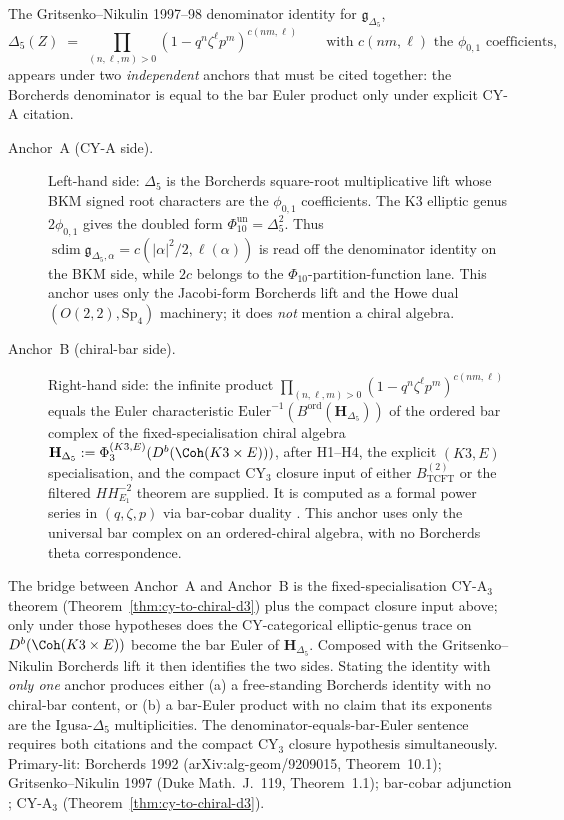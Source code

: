 \begin{remark}
\label{rem:k3e-cy3-two-anchor}
The Gritsenko--Nikulin 1997--98 denominator identity for $\mathfrak{g}_{\Delta_5}$,
\[
 \Delta_5(Z) \;=\; \prod_{(n, \ell, m) > 0} (1 - q^n \zeta^\ell p^m)^{c(nm, \ell)}
 \qquad \text{with } c(nm, \ell) \text{ the }\phi_{0,1}\text{ coefficients},
\]
appears under two \emph{independent} anchors that must be cited together: the Borcherds denominator is equal to the bar Euler product only under explicit CY-A citation.
\begin{description}
 \item[Anchor~A (CY-A side).] Left-hand side: $\Delta_5$ is the Borcherds square-root multiplicative lift whose BKM signed root characters are the \(\phi_{0,1}\) coefficients. The K3 elliptic genus \(2\phi_{0,1}\) gives the doubled form \(\Phi_{10}^{\mathrm{un}}=\Delta_5^2\). Thus \(\operatorname{sdim}\mathfrak g_{\Delta_5,\alpha}=c(|\alpha|^2/2,\ell(\alpha))\) is read off the denominator identity on the BKM side, while \(2c\) belongs to the \(\Phi_{10}\)-partition-function lane. This anchor uses only the Jacobi-form Borcherds lift and the Howe dual $(O(2,2), \mathrm{Sp}_4)$ machinery; it does \emph{not} mention a chiral algebra.
 \item[Anchor~B (chiral-bar side).] Right-hand side: the infinite product $\prod_{(n,\ell,m) > 0}(1 - q^n \zeta^\ell p^m)^{c(nm,\ell)}$ equals the Euler characteristic $\mathrm{Euler}^{-1}(B^{\mathrm{ord}}(\mathbf{H}_{\Delta_5}))$ of the ordered bar complex of the fixed-specialisation chiral algebra $\mathbf{H}_{\Delta_5} := \Phi_3^{(K3,E)}(D^b(\Coh(K3 \times E)))$, after H1--H4, the explicit $(K3,E)$ specialisation, and the compact CY$_3$ closure input of either $B_{\mathrm{TCFT}}^{(2)}$ or the filtered $HH^{-2}_{E_1}$ theorem are supplied. It is computed as a formal power series in $(q, \zeta, p)$ via bar-cobar duality \cite{VolI}. This anchor uses only the universal bar complex on an ordered-chiral algebra, with no Borcherds theta correspondence.
\end{description}
The bridge between Anchor~A and Anchor~B is the fixed-specialisation CY-A$_3$ theorem (Theorem~\ref{thm:cy-to-chiral-d3}) plus the compact closure input above; only under those hypotheses does the CY-categorical elliptic-genus trace on $D^b(\Coh(K3 \times E))$ become the bar Euler of $\mathbf{H}_{\Delta_5}$. Composed with the Gritsenko--Nikulin Borcherds lift it then identifies the two sides. Stating the identity with \emph{only one} anchor produces either (a) a free-standing Borcherds identity with no chiral-bar content, or (b) a bar-Euler product with no claim that its exponents are the Igusa-$\Delta_5$ multiplicities. The denominator-equals-bar-Euler sentence requires both citations and the compact CY$_3$ closure hypothesis simultaneously. Primary-lit: Borcherds 1992 (arXiv:alg-geom/9209015, Theorem~10.1); Gritsenko--Nikulin 1997 (Duke Math.\ J.~119, Theorem~1.1); bar-cobar adjunction \cite{VolI}; CY-A$_3$ (Theorem~\ref{thm:cy-to-chiral-d3}).
\end{remark}

